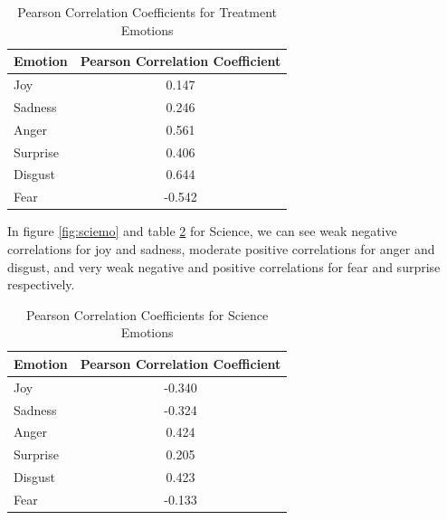 \documentclass{l4proj}
\begin{document}
\begin{table}[h]
\begin{minipage}[c]{\linewidth}
\centering
\begin{tabular}{@{}lc@{}}
\toprule
Emotion  & \multicolumn{1}{l}{Pearson Correlation Coefficient} \\ \midrule
Joy      & 0.147                                              \\
Sadness  & 0.246                                              \\
Anger    & 0.561                                               \\
Surprise & 0.406                                               \\
Disgust  & 0.644                                               \\
Fear     & -0.542                                              \\ \bottomrule
\end{tabular}
\caption{Pearson Correlation Coefficients for Treatment Emotions}
\label{tab:treatemo}
\end{minipage}\hfill

\end{table}

In figure \ref{fig:sciemo} and table \ref{tab:sciemo} for Science, we can see weak negative correlations for joy and sadness, moderate positive correlations for anger and disgust, and very weak negative and positive correlations for fear and surprise respectively.

\begin{table}[H]
\begin{minipage}[c]{\linewidth}
\centering
\begin{tabular}{@{}lc@{}}
\toprule
Emotion  & \multicolumn{1}{l}{Pearson Correlation Coefficient} \\ \midrule
Joy      & -0.340                                              \\
Sadness  & -0.324                                              \\
Anger    & 0.424                                               \\
Surprise & 0.205                                               \\
Disgust  & 0.423                                               \\
Fear     & -0.133                                              \\ \bottomrule
\end{tabular}
\caption{Pearson Correlation Coefficients for Science Emotions}
\label{tab:sciemo}
\end{minipage}\hfill

\end{table}
\end{document}
